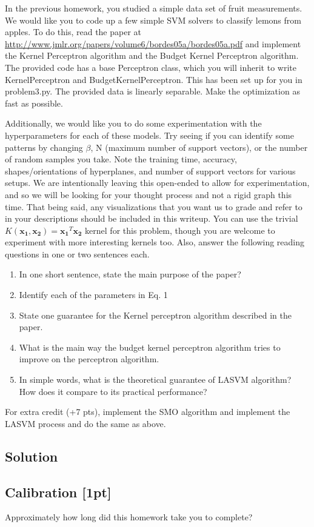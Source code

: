 \documentclass[submit]{harvardml}
\begin{document}
\newpage
\begin{problem}



In the previous homework, you studied a simple data set of fruit measurements.
We would like you to code up a few simple SVM solvers to classify lemons from
apples. To do this, read the paper at
\url{http://www.jmlr.org/papers/volume6/bordes05a/bordes05a.pdf} and implement
the Kernel Perceptron algorithm and the Budget Kernel Perceptron algorithm. The provided code has a base Perceptron class, which you will inherit to write KernelPerceptron and BudgetKernelPerceptron. This has been set up for you in problem3.py. The provided data is linearly separable. Make the optimization as fast as
possible. 

Additionally, we would like you to do some experimentation with the hyperparameters for each of these models. Try seeing if you can identify some patterns by changing $\beta$, N (maximum number of support vectors), or the number of random samples you take.  Note the training time, accuracy,  shapes/orientations of hyperplanes, and number of support vectors for various setups. We are intentionally leaving this open-ended to allow for experimentation, and so we will be looking for your thought process and not a rigid graph this time. That being said, any visualizations that you want us to grade and refer to in your descriptions should be included in this writeup. You can use the trivial $K(\mathbf{x_1}, \mathbf{x_2}) = \mathbf{x_1}^T\mathbf{x_2}$ kernel for this problem, though you are welcome to experiment with more interesting kernels too. Also, answer the following reading questions in one or two sentences each.

\begin{enumerate}
\item In one short sentence, state the main purpose of the paper?
\item Identify each of the parameters in Eq. 1
\item State one guarantee for the Kernel perceptron algorithm described in the
  paper.
\item What is the main way the budget kernel perceptron algorithm tries to
  improve on the perceptron algorithm.
\item In simple words, what is the theoretical guarantee of LASVM algorithm? How
  does it compare to its practical performance?
\end{enumerate}


For extra credit (+7 pts), implement the SMO algorithm and implement the LASVM process and do the same as above.




\end{problem}

\subsection*{Solution}



\newpage

\subsection*{Calibration [1pt]}
Approximately how long did this homework take you to complete?
\end{document}
